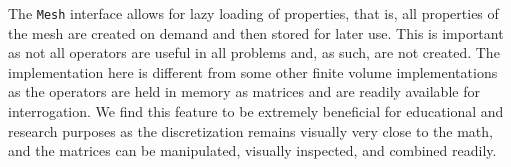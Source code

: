 \documentclass[preprint,review,3p,times,onecolumn,authoryear]{elsarticle}
\newcommand{\Mesh}{\texttt{Mesh}\xspace}
\begin{document}

The \Mesh interface allows for lazy loading of properties, that is,
all properties of the mesh are created on demand and then stored for
later use. This is important as not all operators are useful in all
problems and, as such, are not created. The implementation here is different
from some other finite volume implementations as the operators are held
in memory as matrices and are readily available for interrogation.
We find this feature to be extremely beneficial for educational
and research purposes as the discretization remains visually very
close to the math, and the matrices can be manipulated,
visually inspected, and combined readily.
\end{document}
